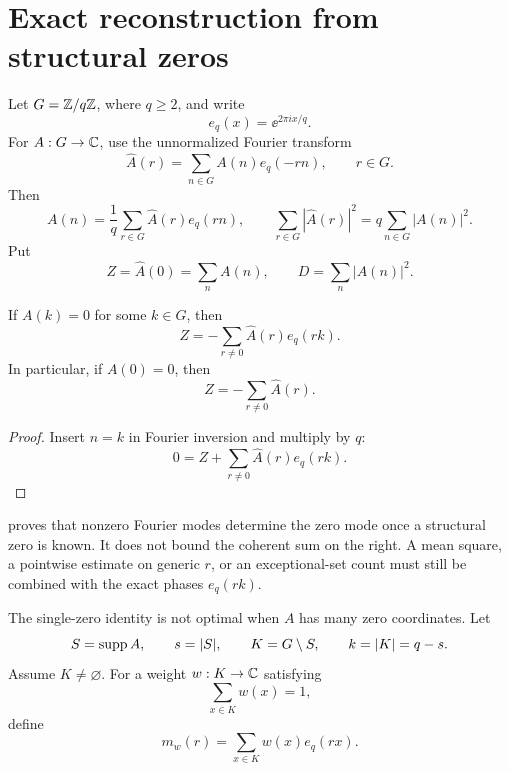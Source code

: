 \section{Exact reconstruction from structural zeros}
\label{sec:fourier-reconstruction}

Let \(G=\mathbb Z/q\mathbb Z\), where \(q\ge2\), and write
\[
 e_q(x)=\ee^{2\pi i x/q}.
\]
For \(A:G\to\mathbb C\), use the unnormalized Fourier transform
\begin{equation}
 \widehat A(r)=\sum_{n\in G}A(n)e_q(-rn),
 \qquad r\in G.
\label{eq:dft}
\end{equation}
Then
\begin{equation}
 A(n)=\frac1q\sum_{r\in G}\widehat A(r)e_q(rn),
\qquad
 \sum_{r\in G}|\widehat A(r)|^2
 =q\sum_{n\in G}|A(n)|^2.
\label{eq:inversion-parseval}
\end{equation}
Put
\[
 Z=\widehat A(0)=\sum_nA(n),\qquad
 D=\sum_n|A(n)|^2.
\]

\begin{proposition}
\label{prop:one-zero}
If \(A(k)=0\) for some \(k\in G\), then
\begin{equation}
 \boxed{
 Z=-\sum_{r\ne0}\widehat A(r)e_q(rk).}
\label{eq:one-zero}
\end{equation}
In particular, if \(A(0)=0\), then
\begin{equation}
 Z=-\sum_{r\ne0}\widehat A(r).
\label{eq:zero-coordinate}
\end{equation}
\end{proposition}

\begin{proof}
Insert \(n=k\) in Fourier inversion and multiply by \(q\):
\[
 0=Z+\sum_{r\ne0}\widehat A(r)e_q(rk).
\]
\end{proof}

\begin{remark}
 proves that nonzero Fourier modes determine the
zero mode once a structural zero is known.  It does not bound the
coherent sum on the right.  A mean square, a pointwise estimate on
generic \(r\), or an exceptional-set count must still be combined
with the exact phases \(e_q(rk)\).
\end{remark}

The single-zero identity is not optimal when \(A\) has many zero
coordinates.  Let
\[
 S=\operatorname{supp} A,\qquad s=|S|,\qquad K=G\setminus S,\qquad k=|K|=q-s.
\]
Assume \(K\ne\varnothing\).  For a weight \(w:K\to\mathbb C\) satisfying
\begin{equation}
 \sum_{x\in K}w(x)=1,
\label{eq:weight-normalization}
\end{equation}
define
\begin{equation}
 m_w(r)=\sum_{x\in K}w(x)e_q(rx).
\label{eq:multiplier}
\end{equation}

